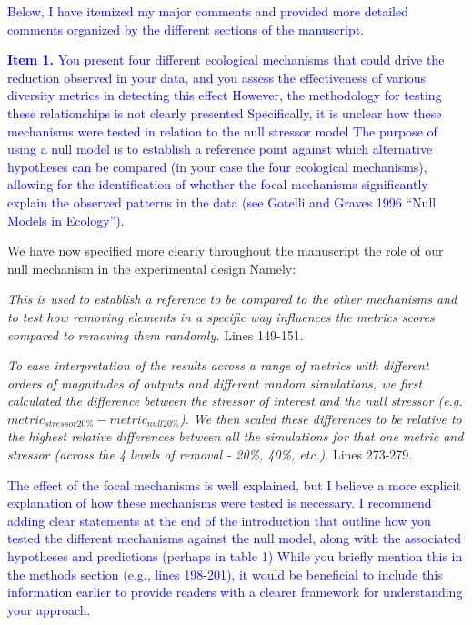 \documentclass[
]{article}
\begin{document}
\textcolor{blue}{Below, I have itemized my major comments and provided more detailed comments organized by the different sections of the manuscript.}

\textcolor{blue}{\textbf{Item 1.}}
\textcolor{blue}{You present four different ecological mechanisms that could drive the reduction observed in your data, and you assess the effectiveness of various diversity metrics in detecting this effect
However, the methodology for testing these relationships is not clearly presented
Specifically, it is unclear how these mechanisms were tested in relation to the null stressor model
The purpose of using a null model is to establish a reference point against which alternative hypotheses can be compared (in your case the four ecological mechanisms), allowing for the identification of whether the focal mechanisms significantly explain the observed patterns in the data (see Gotelli and Graves 1996 ``Null Models in Ecology'').}

We have now specified more clearly throughout the manuscript the role of our null mechanism in the experimental design
Namely:

\textit{This is used to establish a reference to be compared to the other mechanisms and to test how removing elements in a specific way influences the metrics scores compared to removing them randomly.}
Lines 149-151.

\textit{To ease interpretation of the results across a range of metrics with different orders of magnitudes of outputs and different random simulations, we first calculated the difference between the stressor of interest and the null stressor (e.g. $metric_{stressor20\%} - metric_{null20\%}$).
We then scaled these differences to be relative to the highest relative differences between all the simulations for that one metric and stressor (across the 4 levels of removal - 20\%, 40\%, etc.).}
Lines 273-279.

\textcolor{blue}{The effect of the focal mechanisms is well explained, but I believe a more explicit explanation of how these mechanisms were tested is necessary.
I recommend adding clear statements at the end of the introduction that outline how you tested the different mechanisms against the null model, along with the associated hypotheses and predictions (perhaps in table 1)
While you briefly mention this in the methods section (e.g., lines 198-201), it would be beneficial to include this information earlier to provide readers with a clearer framework for understanding your approach.}
\end{document}
